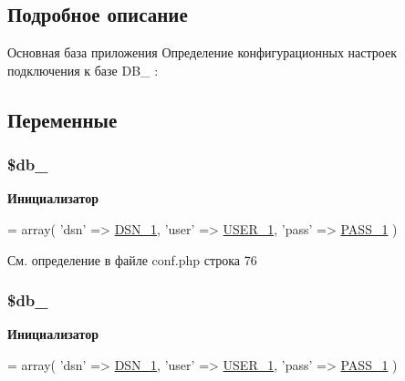 \subsection{Подробное описание}
Основная база приложения Определение конфигурационных настроек подключения к базе D\-B\-\_ \-: 
 

\subsection{Переменные}
\hypertarget{group___d_b__1_ga76fa04d1db973b91108c60680e5b956f}{
\subsubsection[{\$db\-\_\-1}]{\setlength{\rightskip}{0pt plus 5cm}\$db\-\_}}\label{group___d_b__1_ga76fa04d1db973b91108c60680e5b956f}
{\bfseries Инициализатор}
\begin{DoxyCode}
= array(
    \textcolor{stringliteral}{'dsn'} => \hyperlink{group___d_b__1_ga8ed489df371f2fa8bb344efb8d65bc9c}{DSN\_1},
    \textcolor{stringliteral}{'user'} => \hyperlink{group___d_b__1_ga2b39766e2bf04cce22a7deee95879619}{USER\_1},
    \textcolor{stringliteral}{'pass'} => \hyperlink{group___d_b__1_ga5a1b531167aa8e2f89c1f9bf9b32ddf3}{PASS\_1}
)
\end{DoxyCode}


См. определение в файле conf.\-php строка 76

\hypertarget{group___d_b__1_ga76fa04d1db973b91108c60680e5b956f}{
\subsubsection[{\$db\-\_\-1}]{\setlength{\rightskip}{0pt plus 5cm}\$db\-\_}}\label{group___d_b__1_ga76fa04d1db973b91108c60680e5b956f}
{\bfseries Инициализатор}
\begin{DoxyCode}
= array(
    \textcolor{stringliteral}{'dsn'} => \hyperlink{group___d_b__1_ga8ed489df371f2fa8bb344efb8d65bc9c}{DSN\_1},
    \textcolor{stringliteral}{'user'} => \hyperlink{group___d_b__1_ga2b39766e2bf04cce22a7deee95879619}{USER\_1},
    \textcolor{stringliteral}{'pass'} => \hyperlink{group___d_b__1_ga5a1b531167aa8e2f89c1f9bf9b32ddf3}{PASS\_1}
)
\end{DoxyCode}


